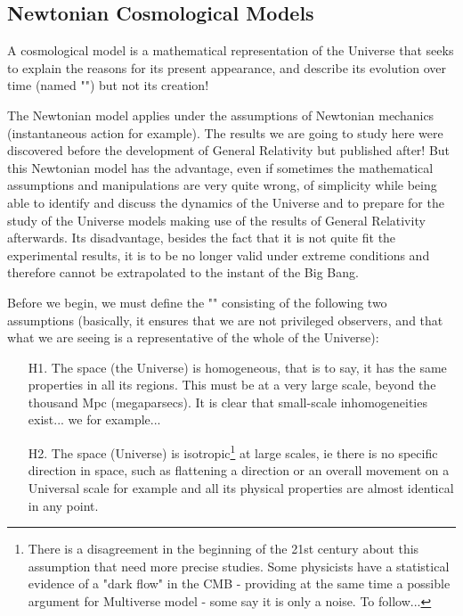 	\subsection{Newtonian Cosmological Models}\label{newtonian cosmological models}
	A cosmological model is a mathematical representation of the Universe that seeks to explain the reasons for its present appearance, and describe its evolution over time (named "") but not its creation!
	
	The Newtonian model applies under the assumptions of Newtonian mechanics (instantaneous action for example). The results we are going to study here were discovered before the development of General Relativity but published after! But this Newtonian model has the advantage, even if sometimes the mathematical assumptions and manipulations are very quite wrong, of simplicity while being able to identify and discuss the dynamics of the Universe and to prepare for the study of the Universe models making use of the results of General Relativity afterwards. Its disadvantage, besides the fact that it is not quite fit the experimental results, it is to be no longer valid under extreme conditions and therefore cannot be extrapolated to the instant of the Big Bang.
	
	Before we begin, we must define the "" consisting of the following two assumptions (basically, it ensures that we are not privileged observers, and that what we are seeing is a representative of the whole of the Universe):
	
	\begin{itemize}
		\item[H1.] The space (the Universe) is homogeneous, that is to say, it has the same properties in all its regions. This must be at a very large scale, beyond the thousand Mpc (megaparsecs). It is clear that small-scale inhomogeneities exist... we for example... \Winkey
		
		\item[H2.] The space (Universe) is isotropic\footnote{There is a disagreement in the beginning of the 21st century about this assumption that need more precise studies. Some physicists have a statistical evidence of a "dark flow" in the CMB - providing at the same time a possible argument for Multiverse model - some say it is only a noise. To follow...} at large scales, ie there is no specific direction in space, such as flattening a direction or an overall movement on a Universal scale for example and all its physical properties are almost identical in any point.
	\end{itemize}
	
